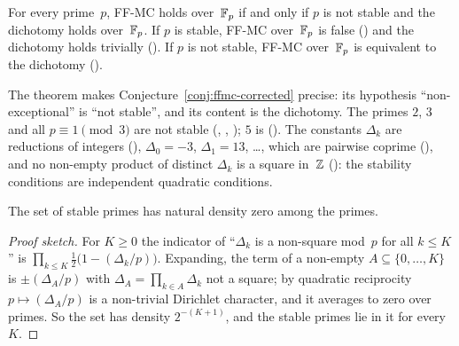 \begin{theorem}
\label{thm:ff-classification}
For every prime~$p$, FF-MC holds over~$\mathbb{F}_p$ if and only if $p$ is not
stable and the dichotomy holds over~$\mathbb{F}_p$.  If $p$ is stable, FF-MC
over~$\mathbb{F}_p$ is false
()
and the dichotomy holds trivially
().
If $p$ is not stable, FF-MC over~$\mathbb{F}_p$ is equivalent to the dichotomy
().
\end{theorem}

The theorem makes Conjecture~\ref{conj:ffmc-corrected} precise: its
hypothesis ``non-exceptional'' is ``not stable'', and its content is the
dichotomy.  The primes $2$, $3$ and all $p \equiv 1 \pmod 3$ are not
stable
(,
,
);
$5$ is ().  The
constants $\Delta_k$ are reductions of integers
(),
$\Delta_0 = -3$, $\Delta_1 = 13$, \dots, which are pairwise coprime
(), and no
non-empty product of distinct $\Delta_k$ is a square in~$\mathbb{Z}$
():
the stability conditions are independent quadratic conditions.

\begin{proposition}
\label{prop:stable-density-zero}
The set of stable primes has natural density zero among the primes.
\end{proposition}

\begin{proof}[Proof sketch]
For $K \ge 0$ the indicator of ``$\Delta_k$ is a non-square mod~$p$ for
all $k \le K$'' is $\prod_{k\le K}\tfrac12\bigl(1 - (\Delta_k/p)\bigr)$.
Expanding, the term of a non-empty $A \subseteq \{0,\dots,K\}$ is
$\pm(\Delta_A/p)$ with $\Delta_A = \prod_{k \in A}\Delta_k$ not a
square; by quadratic reciprocity $p \mapsto (\Delta_A/p)$ is a
non-trivial Dirichlet character, and it averages to zero over primes.
So the set has density $2^{-(K+1)}$, and the stable primes lie in it for
every~$K$.
\end{proof}

